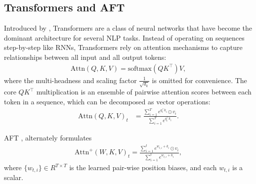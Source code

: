 \documentclass[11pt]{article}
\begin{document}
\subsection{Transformers and AFT} \label{sec:background-attn} %
Introduced by \citet{vaswani2017attention}, Transformers are a class of neural networks that have become the dominant architecture for several NLP tasks. Instead of operating on sequences step-by-step like RNNs, Transformers rely on attention mechanisms to capture relationships between all input and all output tokens:
\begin{align}
\mathrm{Attn}(Q, K, V) = \mathrm{softmax}(QK^\top)V,
\end{align}
where the multi-headness and scaling factor $\frac{1}{\sqrt{d_k}}$ is omitted for convenience. The core $QK^\top$ multiplication is an ensemble of pairwise attention scores between each token in a sequence, which can be decomposed as vector operations:
\begin{align}
\mathrm{Attn}(Q, K, V)_t &= \frac{\sum_{i=1}^{T} e^{q^{\top}_t k_i} \odot v_i}{\sum_{i=1}^{T} e^{q^{\top}_t k_i}}.
\end{align}

AFT \cite{zhai2021attention}, alternately formulates
\begin{align}
\mathrm{Attn}^{+}(W,K,V)_t = \frac{ \sum_{i=1}^{t} e^{w_{t,i}+k_i} \odot v_i}{\sum_{i=1}^{t} e^{w_{t,i}+k_i}},
\end{align}
where $\{w_{t,i}\}\in R^{T\times T}$ is the learned pair-wise position biases, and each $w_{t,i}$ is a scalar.
\end{document}
